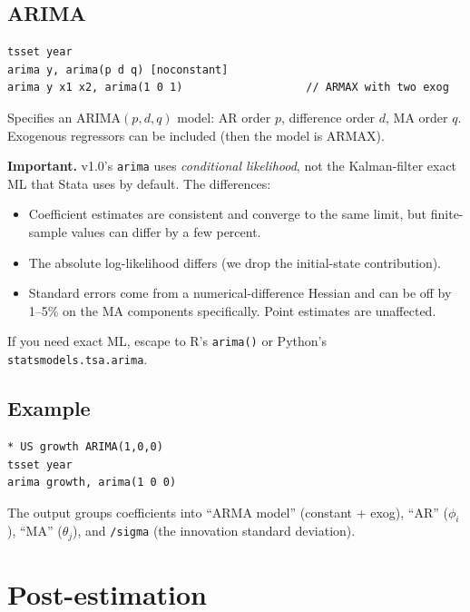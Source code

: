 \documentclass[11pt,letterpaper]{article}
\newcommand{\teaversion}{1.0}
\begin{document}
\subsection{ARIMA}

\begin{lstlisting}
tsset year
arima y, arima(p d q) [noconstant]
arima y x1 x2, arima(1 0 1)                   // ARMAX with two exog
\end{lstlisting}

Specifies an ARIMA$(p, d, q)$ model: AR order $p$, difference order $d$,
MA order $q$.  Exogenous regressors can be included (then the model
is ARMAX).

\textbf{Important.}  v\teaversion's \texttt{arima} uses \emph{conditional
likelihood}, not the Kalman-filter exact ML that Stata uses by default.
The differences:

\begin{itemize}
\item Coefficient estimates are consistent and converge to the same
limit, but finite-sample values can differ by a few percent.
\item The absolute log-likelihood differs (we drop the initial-state
contribution).
\item Standard errors come from a numerical-difference Hessian and
can be off by 1--5\% on the MA components specifically.  Point
estimates are unaffected.
\end{itemize}

If you need exact ML, escape to R's \texttt{arima()} or Python's
\texttt{statsmodels.tsa.arima}.

\subsection{Example}

\begin{lstlisting}
* US growth ARIMA(1,0,0)
tsset year
arima growth, arima(1 0 0)
\end{lstlisting}

The output groups coefficients into ``ARMA model'' (constant + exog),
``AR'' ($\phi_i$), ``MA'' ($\theta_j$), and \texttt{/sigma} (the
innovation standard deviation).

\section{Post-estimation}
\end{document}
